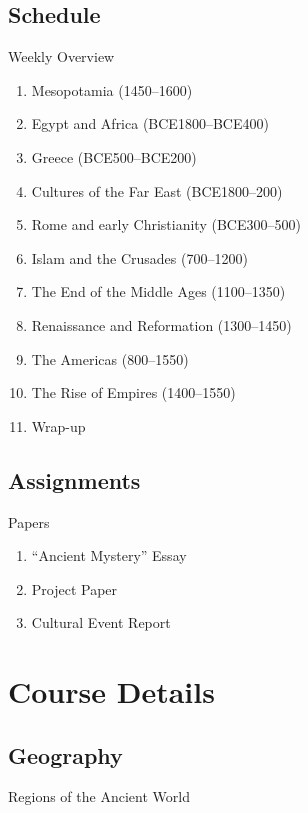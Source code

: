 

\subsection{Schedule}
\begin{frame}{Weekly Overview}
	\begin{enumerate}
		\item<1->Mesopotamia (1450--1600)					%
		\item<2->Egypt and Africa (BCE1800--BCE400)			%
		\item<3->Greece (BCE500--BCE200)					%
		\item<4->Cultures of the Far East (BCE1800--200)	%
		\item<5->Rome and early Christianity (BCE300--500)	%
		\item<6->Islam and the Crusades (700--1200)			%
		\item<7->The End of the Middle Ages (1100--1350)	%
		\item<8->Renaissance and Reformation (1300--1450)	%
		\item<9->The Americas (800--1550)					%
		\item<10->The Rise of Empires (1400--1550)			%
		\item<11->Wrap-up									%
	\end{enumerate}
\end{frame}

\subsection{Assignments}
\begin{frame}{Papers}
	\begin{enumerate}
		\item<1->``Ancient Mystery'' Essay
		\item<2->Project Paper
		\item<3->Cultural Event Report
	\end{enumerate}
\end{frame}

\section{Course Details}
\subsection{Geography}
\begin{frame}{Regions of the Ancient World}
\end{frame}

